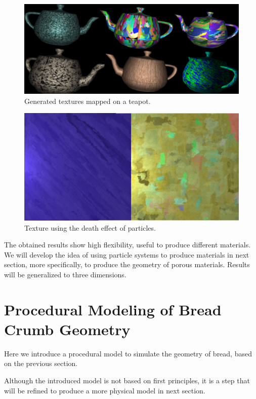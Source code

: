 \begin{figure}[t!]
\centering
\includegraphics[scale=0.14]{teteras}
\caption{Generated textures mapped on a teapot.}
\label{teteras}
\end{figure}


\begin{figure}[t!]
\centering
\includegraphics[scale=0.2]{muerte}
\caption{Texture using the death effect of particles.}
\label{muerte}
\end{figure}

The obtained results show high flexibility, useful to produce different materials.
We will develop the idea of using particle systems to produce materials in next section, more specifically, to produce the geometry of porous materials.
Results will be generalized to three dimensions.

\section{Procedural Modeling of Bread Crumb Geometry}
Here we introduce a procedural model to simulate the geometry of bread, based on the previous section.

Although the introduced model is not based on first principles, it is a step that will be refined to produce a more physical model in next section.

